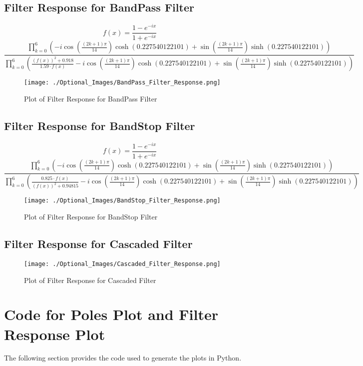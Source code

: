 \documentclass{article}
\begin{document}
\subsection{Filter Response for BandPass Filter}
\[
    f(x) = \frac{1 - e^{-ix}}{1 + e^{-ix}}
\]
\[
\frac{\prod_{k=0}^{6} \left( -i \cos\left(\frac{(2k+1) \pi}{14}\right) \cosh(0.227540122101) + \sin\left(\frac{(2k+1) \pi}{14}\right) \sinh(0.227540122101) \right)}
{\prod_{k=0}^{6} \left( \frac{\left(f(x)\right)^2 + 0.918}{1.59 \cdot f(x)} - i \cos\left(\frac{(2k+1) \pi}{14}\right) \cosh(0.227540122101) + \sin\left(\frac{(2k+1) \pi}{14}\right) \sinh(0.227540122101) \right)}
\]
\begin{figure}[h!]
    \centering
    \texttt{[image: ./Optional\_Images/BandPass\_Filter\_Response.png]}
    \caption{Plot of Filter Response for BandPass Filter}
    \label{fig:enter-label}
\end{figure}

\newpage
\subsection{Filter Response for BandStop Filter}
\[
    f(x) = \frac{1 - e^{-ix}}{1 + e^{-ix}}
\]
\[
\frac{\prod_{k=0}^{6} \left( -i \cos\left(\frac{(2k+1) \pi}{14}\right) \cosh(0.227540122101) + \sin\left(\frac{(2k+1) \pi}{14}\right) \sinh(0.227540122101) \right)}
{\prod_{k=0}^{6} \left( \frac{0.825 \cdot f(x)}{\left(f(x)\right)^2 + 0.94815} - i \cos\left(\frac{(2k+1) \pi}{14}\right) \cosh(0.227540122101) + \sin\left(\frac{(2k+1) \pi}{14}\right) \sinh(0.227540122101) \right)}
\]
\begin{figure}[h!]
    \centering
    \texttt{[image: ./Optional\_Images/BandStop\_Filter\_Response.png]}
    \caption{Plot of Filter Response for BandStop Filter}
    \label{fig:enter-label}
\end{figure}

\subsection{Filter Response for Cascaded Filter}
\begin{figure}[h!]
    \centering
    \texttt{[image: ./Optional\_Images/Cascaded\_Filter\_Response.png]}
    \caption{Plot of Filter Response for Cascaded Filter}
    \label{fig:enter-label}
\end{figure}


\newpage 
\section{Code for Poles Plot and Filter Response Plot}
The following section provides the code used to generate the plots in Python.
\end{document}
